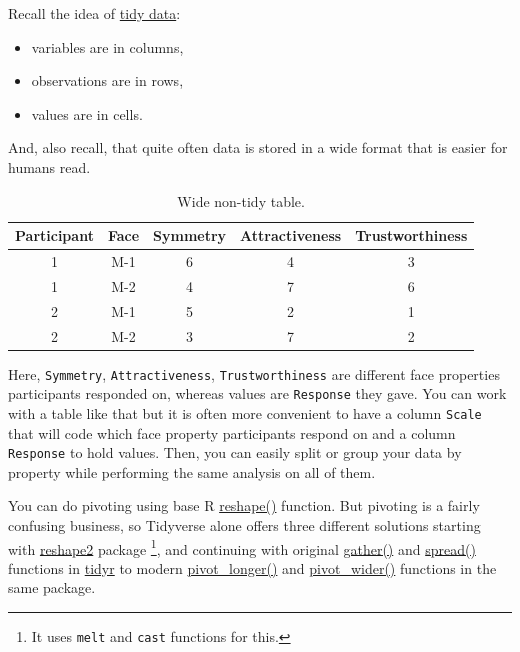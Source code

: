 \documentclass[
]{book}
\providecommand{\tightlist}{%
  \setlength{\itemsep}{0pt}\setlength{\parskip}{0pt}}
\begin{document}
Recall the idea of \protect\hyperlink{tidydata}{tidy data}:

\begin{itemize}
\tightlist
\item
  variables are in columns,
\item
  observations are in rows,
\item
  values are in cells.
\end{itemize}

And, also recall, that quite often data is stored in a wide format that is easier for humans read.

\begin{table}

\caption{\label{tab:unnamed-chunk-206}Wide non-tidy table.}
\centering
\begin{tabular}[t]{c|c|c|c|c}
\hline
Participant & Face & Symmetry & Attractiveness & Trustworthiness\\
\hline
1 & M-1 & 6 & 4 & 3\\
\hline
1 & M-2 & 4 & 7 & 6\\
\hline
2 & M-1 & 5 & 2 & 1\\
\hline
2 & M-2 & 3 & 7 & 2\\
\hline
\end{tabular}
\end{table}

Here, \texttt{Symmetry}, \texttt{Attractiveness}, \texttt{Trustworthiness} are different face properties participants responded on, whereas values are \texttt{Response} they gave. You can work with a table like that but it is often more convenient to have a column \texttt{Scale} that will code which face property participants respond on and a column \texttt{Response} to hold values. Then, you can easily split or group your data by property while performing the same analysis on all of them.

You can do pivoting using base R \href{https://stat.ethz.ch/R-manual/R-patched/library/stats/html/reshape.html}{reshape()} function. But pivoting is a fairly confusing business, so Tidyverse alone offers three different solutions starting with \href{https://cran.r-project.org/package=reshape2}{reshape2} package \footnote{It uses \texttt{melt} and \texttt{cast} functions for this.}, and continuing with original \href{https://tidyr.tidyverse.org/reference/gather.html}{gather()} and \href{https://tidyr.tidyverse.org/reference/spread.html}{spread()}
functions in \href{https://tidyr.tidyverse.org/index.html}{tidyr} to modern \href{https://tidyr.tidyverse.org/reference/pivot_longer.html}{pivot\_longer()} and \href{https://tidyr.tidyverse.org/reference/pivot_wider.html}{pivot\_wider()} functions in the same package.
\end{document}
